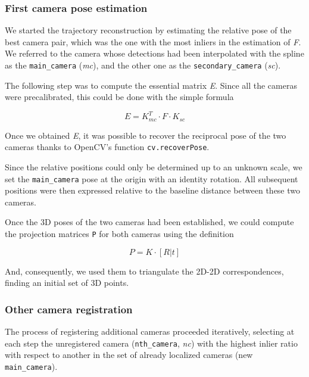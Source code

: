 \documentclass[11pt]{article}
\begin{document}
\subsubsection{First camera pose estimation}

We started the trajectory reconstruction by estimating the relative pose of the best camera pair, which was the one with the most inliers in the estimation of \textit{F}. We referred to the camera whose detections had been interpolated with the spline as the \texttt{main\_camera} (\textit{mc}), and the other one as the \texttt{secondary\_camera} (\textit{sc}).

The following step was to compute the essential matrix \textit{E}. Since all the cameras were precalibrated, this could be done with the simple formula

\begin{equation}
    E = K_{mc}^T \cdot F \cdot K_{sc}
\end{equation}

Once we obtained \textit{E}, it was possible to recover the reciprocal pose of the two cameras thanks to OpenCV's function \texttt{cv.recoverPose}.

Since the relative positions could only be determined up to an unknown scale, we set the \texttt{main\_camera} pose at the origin with an identity rotation. All subsequent positions were then expressed relative to the baseline distance between these two cameras.

Once the 3D poses of the two cameras had been established, we could compute the projection matrices \texttt{P} for both cameras using the definition

\begin{equation}
    P = K \cdot [R | t]
\end{equation}

And, consequently, we used them to triangulate the 2D-2D correspondences, finding an initial set of 3D points.

\subsubsection{Other camera registration}

The process of registering additional cameras proceeded iteratively, selecting at each step the unregistered camera (\texttt{nth\_camera}, \textit{nc}) with the highest inlier ratio with respect to another in the set of already localized cameras (new \texttt{main\_camera}).
\end{document}
